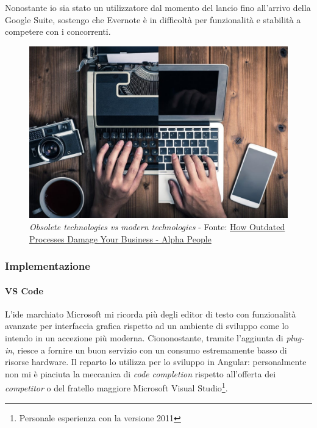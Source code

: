 Nonostante io sia stato un utilizzatore dal momento del lancio fino all'arrivo della Google Suite, sostengo che Evernote è in difficoltà per funzionalità e stabilità a competere con i concorrenti.
\vspace{20pt}
\begin{figure}[H]
    \centering
    \includegraphics[width=0.75\columnwidth]{immagini/outdated.jpeg}
    \caption{\textit{Obsolete technologies vs modern technologies} - Fonte: \href{https://alfapeople.com/outdated-processes-damage-business-part-1-obsolete-technologies/}{How Outdated Processes Damage Your Business - Alpha People}}
    \label{fig:oldTech}
\end{figure}
\newpage

\subsubsection{Implementazione}
\paragraph{VS Code}
L'\acrshort{ide} marchiato Microsoft mi ricorda più degli editor di testo con funzionalità avanzate per interfaccia grafica rispetto ad un ambiente di sviluppo come lo intendo in un accezione più moderna. Ciononostante, tramite l'aggiunta di \textit{plug-in}, riesce a fornire un buon servizio con un consumo estremamente basso di risorse hardware.
Il reparto lo utilizza per lo sviluppo in Angular: personalmente non mi è piaciuta la meccanica di \textit{code completion} rispetto all'offerta dei \textit{competitor} o del fratello maggiore Microsoft Visual Studio\footnote{Personale esperienza con la versione 2011}.
